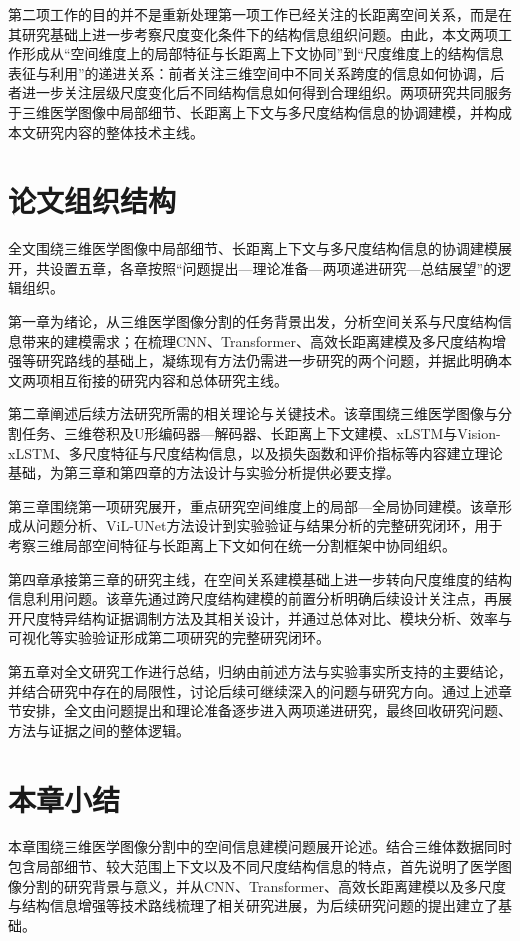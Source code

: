 第二项工作的目的并不是重新处理第一项工作已经关注的长距离空间关系，而是在其研究基础上进一步考察尺度变化条件下的结构信息组织问题。由此，本文两项工作形成从“空间维度上的局部特征与长距离上下文协同”到“尺度维度上的结构信息表征与利用”的递进关系：前者关注三维空间中不同关系跨度的信息如何协调，后者进一步关注层级尺度变化后不同结构信息如何得到合理组织。两项研究共同服务于三维医学图像中局部细节、长距离上下文与多尺度结构信息的协调建模，并构成本文研究内容的整体技术主线。

\section{论文组织结构}

全文围绕三维医学图像中局部细节、长距离上下文与多尺度结构信息的协调建模展开，共设置五章，各章按照“问题提出—理论准备—两项递进研究—总结展望”的逻辑组织。

第一章为绪论，从三维医学图像分割的任务背景出发，分析空间关系与尺度结构信息带来的建模需求；在梳理CNN、Transformer、高效长距离建模及多尺度结构增强等研究路线的基础上，凝练现有方法仍需进一步研究的两个问题，并据此明确本文两项相互衔接的研究内容和总体研究主线。

第二章阐述后续方法研究所需的相关理论与关键技术。该章围绕三维医学图像与分割任务、三维卷积及U形编码器—解码器、长距离上下文建模、xLSTM与Vision-xLSTM、多尺度特征与尺度结构信息，以及损失函数和评价指标等内容建立理论基础，为第三章和第四章的方法设计与实验分析提供必要支撑。

第三章围绕第一项研究展开，重点研究空间维度上的局部—全局协同建模。该章形成从问题分析、ViL-UNet方法设计到实验验证与结果分析的完整研究闭环，用于考察三维局部空间特征与长距离上下文如何在统一分割框架中协同组织。

第四章承接第三章的研究主线，在空间关系建模基础上进一步转向尺度维度的结构信息利用问题。该章先通过跨尺度结构建模的前置分析明确后续设计关注点，再展开尺度特异结构证据调制方法及其相关设计，并通过总体对比、模块分析、效率与可视化等实验验证形成第二项研究的完整研究闭环。

第五章对全文研究工作进行总结，归纳由前述方法与实验事实所支持的主要结论，并结合研究中存在的局限性，讨论后续可继续深入的问题与研究方向。通过上述章节安排，全文由问题提出和理论准备逐步进入两项递进研究，最终回收研究问题、方法与证据之间的整体逻辑。

\section{本章小结}

本章围绕三维医学图像分割中的空间信息建模问题展开论述。结合三维体数据同时包含局部细节、较大范围上下文以及不同尺度结构信息的特点，首先说明了医学图像分割的研究背景与意义，并从CNN、Transformer、高效长距离建模以及多尺度与结构信息增强等技术路线梳理了相关研究进展，为后续研究问题的提出建立了基础。

